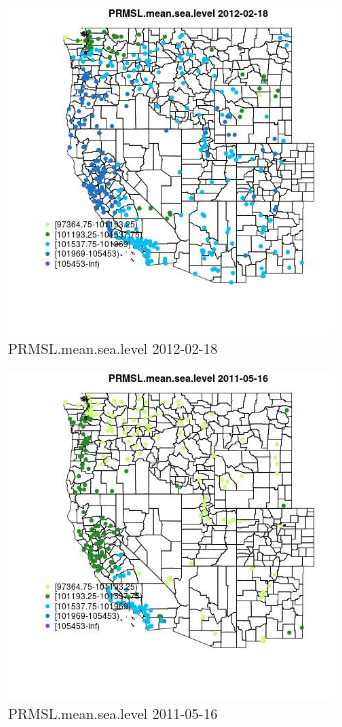 \begin{figure} 
\centering  
\includegraphics[width=0.77\textwidth]{Code_Outputs/Report_ML_input_PM25_Step4_part_f_de_duplicated_aveswNAs_MapObsPRMSLmeansealevel2012-02-18.jpg} 
\caption{\label{fig:Report_ML_input_PM25_Step4_part_f_de_duplicated_aveswNAsMapObsPRMSLmeansealevel2012-02-18}PRMSL.mean.sea.level 2012-02-18} 
\end{figure} 
 

\begin{figure} 
\centering  
\includegraphics[width=0.77\textwidth]{Code_Outputs/Report_ML_input_PM25_Step4_part_f_de_duplicated_aveswNAs_MapObsPRMSLmeansealevel2011-05-16.jpg} 
\caption{\label{fig:Report_ML_input_PM25_Step4_part_f_de_duplicated_aveswNAsMapObsPRMSLmeansealevel2011-05-16}PRMSL.mean.sea.level 2011-05-16} 
\end{figure} 
 

